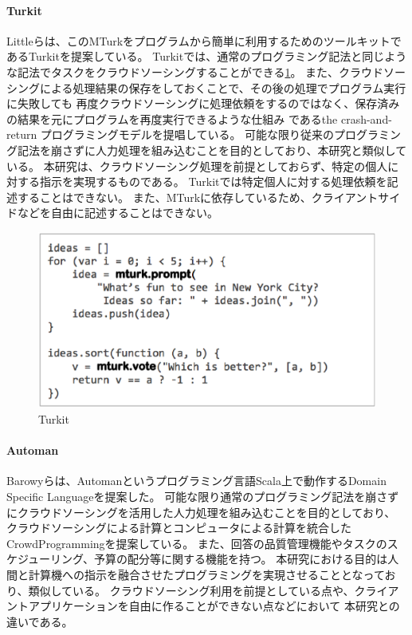 \paragraph{Turkit}\label{turkit}

\mbox{}

Littleらは、このMTurkをプログラムから簡単に利用するためのツールキットであるTurkit\cite{turkit}を提案している。
Turkitでは、通常のプログラミング記法と同じような記法でタスクをクラウドソーシングすることができる\ref{fig:turkit}。
また、クラウドソーシングによる処理結果の保存をしておくことで、その後の処理でプログラム実行に失敗しても
再度クラウドソーシングに処理依頼をするのではなく、保存済みの結果を元にプログラムを再度実行できるような仕組み
であるthe crash-and-return プログラミングモデルを提唱している。
可能な限り従来のプログラミング記法を崩さずに人力処理を組み込むことを目的としており、本研究と類似している。
本研究は、クラウドソーシング処理を前提としておらず、特定の個人に対する指示を実現するものである。
Turkitでは特定個人に対する処理依頼を記述することはできない。
また、MTurkに依存しているため、クライアントサイドなどを自由に記述することはできない。

\begin{figure}[htbp]
  \begin{center}
  \includegraphics[width=.6\linewidth]{images/turkit.eps}
  \end{center}
  \caption{Turkit}
  \label{fig:turkit}
\end{figure}

\paragraph{Automan}\label{automan}

\mbox{}

Barowyらは、Automanというプログラミング言語Scala上で動作するDomain
Specific Languageを提案した\cite{automan}。
可能な限り通常のプログラミング記法を崩さずにクラウドソーシングを活用した人力処理を組み込むことを目的としており、
クラウドソーシングによる計算とコンピュータによる計算を統合したCrowdProgrammingを提案している。
また、回答の品質管理機能やタスクのスケジューリング、予算の配分等に関する機能を持つ。
本研究における目的は人間と計算機への指示を融合させたプログラミングを実現させることとなっており、類似している。
クラウドソーシング利用を前提としている点や、クライアントアプリケーションを自由に作ることができない点などにおいて
本研究との違いである。

